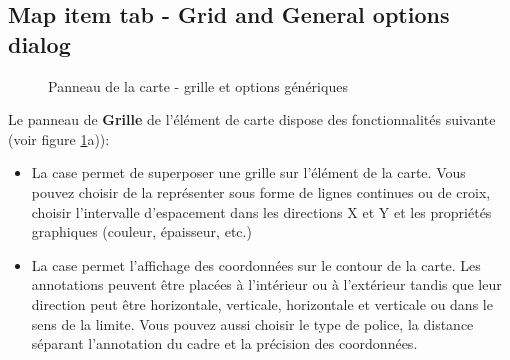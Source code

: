 \subsection{Map item tab - Grid and General options dialog}

\begin{figure}[ht]
\centering
   \hspace{1cm}
    \caption{Panneau de la carte - grille et options génériques \nixcaption}\label{fig:sec_map_dialog}
\end{figure}
\FloatBarrier

Le panneau de \textbf{Grille} de l'élément de carte dispose des fonctionnalités suivante (voir figure \ref{fig:sec_map_dialog}a)):

\begin{itemize}[label=--]
\item La case  permet de superposer une grille sur l'élément de la carte. Vous pouvez choisir de la représenter sous forme de lignes continues ou de croix, choisir l'intervalle d'espacement dans les directions X et Y et les propriétés graphiques (couleur, épaisseur, etc.)
\item La case  permet l'affichage des coordonnées sur le contour de la carte. Les annotations peuvent être placées à l'intérieur ou à l'extérieur tandis que leur direction peut être horizontale, verticale, horizontale et verticale ou dans le sens de la limite. Vous pouvez aussi choisir le type de police, la distance séparant l'annotation du cadre et la précision des coordonnées. 
\end{itemize}

